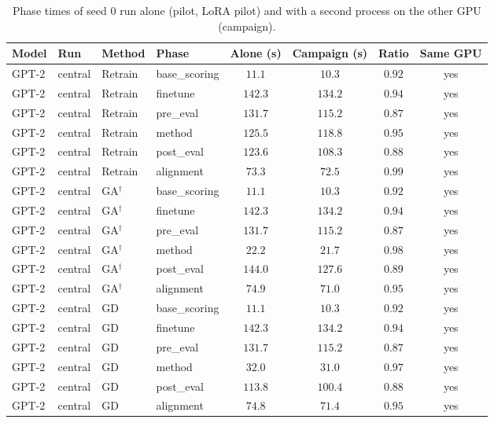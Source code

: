 \begin{table}[t]
\centering
\caption{Phase times of seed 0 run alone (pilot, LoRA pilot) and with a second process on the other GPU (campaign).}
\label{tab:pilot-slowdown}
\footnotesize
\renewcommand{\arraystretch}{1.2}
\setlength{\tabcolsep}{5pt}
\begin{tabular*}{\textwidth}{@{\extracolsep{\fill}}llllcccc@{}}
\toprule
\textbf{Model} & \textbf{Run} & \textbf{Method} & \textbf{Phase} & \textbf{Alone (s)} & \textbf{Campaign (s)} & \textbf{Ratio} & \textbf{Same GPU} \\
\midrule
GPT-2 & central & Retrain & base\_scoring & $11.1$ & $10.3$ & $0.92$ & yes \\
GPT-2 & central & Retrain & finetune & $142.3$ & $134.2$ & $0.94$ & yes \\
GPT-2 & central & Retrain & pre\_eval & $131.7$ & $115.2$ & $0.87$ & yes \\
GPT-2 & central & Retrain & method & $125.5$ & $118.8$ & $0.95$ & yes \\
GPT-2 & central & Retrain & post\_eval & $123.6$ & $108.3$ & $0.88$ & yes \\
GPT-2 & central & Retrain & alignment & $73.3$ & $72.5$ & $0.99$ & yes \\
GPT-2 & central & GA$^{\dagger}$ & base\_scoring & $11.1$ & $10.3$ & $0.92$ & yes \\
GPT-2 & central & GA$^{\dagger}$ & finetune & $142.3$ & $134.2$ & $0.94$ & yes \\
GPT-2 & central & GA$^{\dagger}$ & pre\_eval & $131.7$ & $115.2$ & $0.87$ & yes \\
GPT-2 & central & GA$^{\dagger}$ & method & $22.2$ & $21.7$ & $0.98$ & yes \\
GPT-2 & central & GA$^{\dagger}$ & post\_eval & $144.0$ & $127.6$ & $0.89$ & yes \\
GPT-2 & central & GA$^{\dagger}$ & alignment & $74.9$ & $71.0$ & $0.95$ & yes \\
GPT-2 & central & GD & base\_scoring & $11.1$ & $10.3$ & $0.92$ & yes \\
GPT-2 & central & GD & finetune & $142.3$ & $134.2$ & $0.94$ & yes \\
GPT-2 & central & GD & pre\_eval & $131.7$ & $115.2$ & $0.87$ & yes \\
GPT-2 & central & GD & method & $32.0$ & $31.0$ & $0.97$ & yes \\
GPT-2 & central & GD & post\_eval & $113.8$ & $100.4$ & $0.88$ & yes \\
GPT-2 & central & GD & alignment & $74.8$ & $71.4$ & $0.95$ & yes \\

\end{tabular*}
\end{table}
